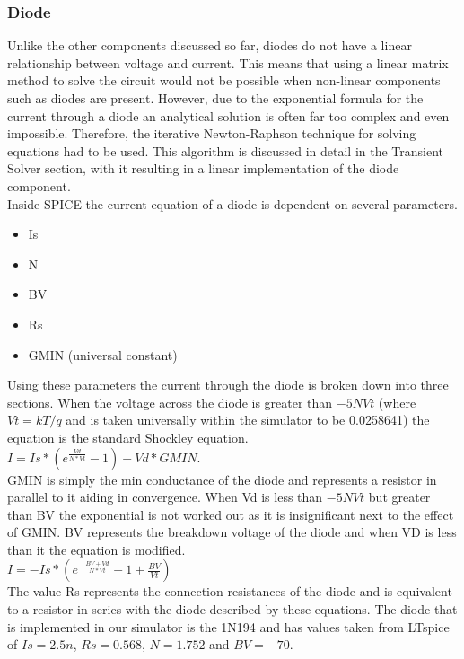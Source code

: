 \documentclass{article}
\begin{document}
\subsubsection{Diode}
Unlike the other components discussed so far, diodes do not have a linear relationship between voltage and current. This means that using a linear matrix method to solve the circuit would not be possible when non-linear components such as diodes are present. However, due to the exponential formula for the current through a diode an analytical solution is often far too complex and even impossible. Therefore, the iterative Newton-Raphson technique for solving equations had to be used. This algorithm is discussed in detail in the Transient Solver section, with it resulting in a linear implementation of the diode component.
\\
Inside SPICE the current equation of a diode is dependent on several parameters. 
\begin{itemize}
    \item Is
    \item N
    \item BV
    \item Rs
    \item GMIN (universal constant)
\end{itemize}
Using these parameters the current through the diode is broken down into three sections. When the voltage across the diode is greater than $-5NVt$ (where $Vt = kT/q$ and is taken universally within the simulator to be 0.0258641) the equation is the standard Shockley equation.\bigbreak \\ $I = Is*(e^{\frac{Vd}{N*Vt}}-1) + Vd*GMIN$. \\\bigbreak GMIN is simply the min conductance of the diode and represents a resistor in parallel to it aiding in convergence. When Vd is less than $-5NVt$ but greater than BV the exponential is not worked out as it is insignificant next to the effect of GMIN. BV represents the breakdown voltage of the diode and when VD is less than it the equation is modified.\bigbreak
\\$I = -Is*(e^{-\frac{BV+Vd}{N*Vt}}-1+\frac{BV}{Vt})$\\\bigbreak
The value Rs represents the connection resistances of the diode and is equivalent to a resistor in series with the diode described by these equations. The diode that is implemented in our simulator is the 1N194 and has values taken from LTspice of $Is=2.5n$, $Rs=0.568$, $N=1.752$ and $BV = -70$.  
\\
\end{document}

